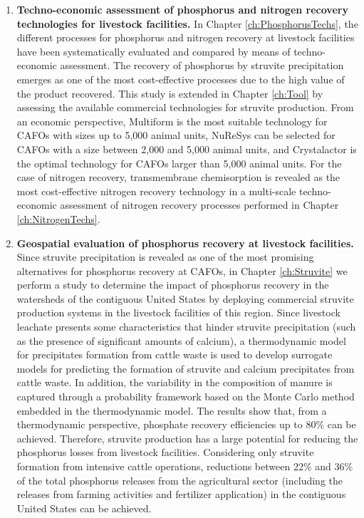 \begin{enumerate}[font=\bfseries]
	\item \textbf{Techno-economic assessment of phosphorus and nitrogen recovery technologies for livestock facilities.} In Chapter \ref{ch:PhosphorusTechs}, the different processes for phosphorus and nitrogen recovery at livestock facilities have been systematically evaluated and compared by means of techno-economic assessment. The recovery of phosphorus by struvite precipitation
	emerges as one of the most cost-effective processes due to the high value of the product recovered. This study is extended in Chapter \ref{ch:Tool} by assessing the available commercial technologies for struvite production. From an economic perspective, Multiform is the most suitable technology for CAFOs with sizes up to 5,000 animal units, NuReSys can be selected for CAFOs with a size between 2,000 and 5,000 animal units, and Crystalactor is the optimal technology for CAFOs larger than 5,000 animal units.
	For the case of nitrogen recovery, transmembrane chemisorption is revealed as the most cost-effective nitrogen recovery technology in a multi-scale techno-economic assessment of nitrogen recovery processes performed in Chapter \ref{ch:NitrogenTechs}. 
	
	\item \textbf{Geospatial evaluation of phosphorus recovery at livestock facilities.} Since struvite precipitation is revealed as one of the most promising alternatives for phosphorus recovery at CAFOs, in Chapter \ref{ch:Struvite} we perform a study to determine the impact of phosphorus recovery in the watersheds of the contiguous United States by deploying commercial struvite production systems in the livestock facilities of this region. Since livestock leachate 	presents some characteristics that hinder struvite precipitation (such as the presence of significant amounts of calcium), a
	thermodynamic model for precipitates formation from cattle waste is used to develop surrogate models for predicting the formation of struvite and calcium precipitates from cattle waste. In addition, the variability in the composition of manure is captured through a probability framework based on the Monte Carlo method embedded in the thermodynamic model. The results show that, from a thermodynamic perspective, phosphate recovery efficiencies up to 80\% can be achieved. Therefore, struvite production has a large potential for reducing the phosphorus losses from livestock facilities. Considering only struvite formation from intensive cattle operations, reductions between 22\% and 36\% of the total phosphorus releases from the 	agricultural sector (including the releases from farming activities and fertilizer application) in the contiguous United States can be achieved.
	

\end{enumerate}
